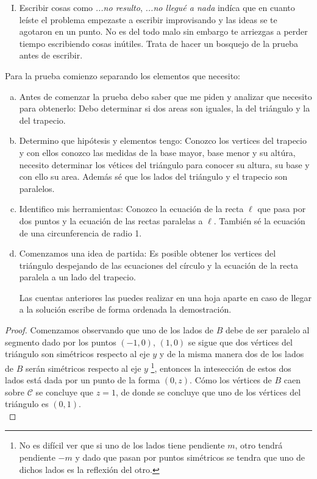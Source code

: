 \documentclass[10pt]{article}
\begin{document}
\begin{itemize}
\begin{enumerate}[I)]
\item Escribir cosas como \textit{...no resulto}, \textit{...no llegué a nada} indíca que en cuanto leíste el problema empezaste a escribir improvisando y las ideas se te agotaron en un punto. No es del todo malo sin embargo te arriezgas a perder tiempo escribiendo cosas inútiles. Trata de hacer un bosquejo de la prueba antes de escribir. 

\end{enumerate}
Para la prueba comienzo separando los elementos que necesito:

\begin{enumerate}[a)]
\item Antes de comenzar la prueba debo saber que me piden y analizar que necesito para obtenerlo: Debo determinar si dos areas son iguales, la del triángulo y la del trapecio. \\

\item Determino que hipótesis y elementos tengo: Conozco los vertices del trapecio y con ellos conozco las medidas de la base mayor, base menor y su altúra, necesito determinar los vétices del triángulo para conocer su altura, su base y con ello su area. Además sé que los lados del triángulo y el trapecio son paralelos.

\item Identifico mis herramientas: Conozco la ecuación de la recta $\ell$ que pasa por dos puntos y la ecuación de las rectas paralelas a $\ell.$ También sé la ecuación de una circunferencia de radio 1.  

\item Comenzamos una idea de partida: Es posible obtener los vertices del triángulo despejando de las ecuaciones del círculo y la ecuación de la recta paralela a un lado del trapecio. 

Las cuentas anteriores las puedes realizar en una hoja aparte en caso de llegar a la solución escribe de forma ordenada la demostración.

\end{enumerate}

\begin{proof} Comenzamos observando que uno de los lados de $B$ debe de ser paralelo al segmento dado por los puntos $(-1,0)$, $(1,0)$ se sigue que dos vértices del triángulo son simétricos respecto al eje $y$ y de la misma manera dos de los lados de $B$ serán simétricos respecto al eje $y$ \footnote{No es difícil ver que si uno de los lados tiene pendiente $m$, otro tendrá pendiente $-m$ y dado que pasan por puntos simétricos se tendra que uno de dichos lados es la reflexión del otro.}, entonces la intesección de estos dos lados está dada por un punto de la forma $(0,z)$. Cómo los vértices de $B$ caen sobre $\mathcal{C}$ se concluye que $z=1$, de donde se concluye que uno de los vértices del triángulo es $(0,1).$\\


\end{proof}
\end{itemize}
\end{document}
